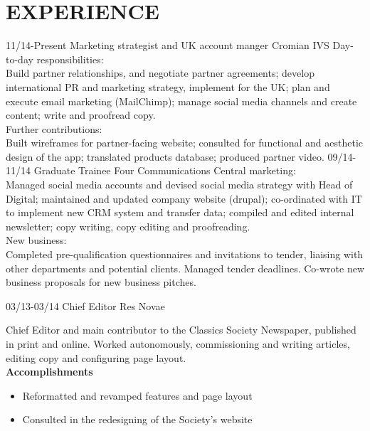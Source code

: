 \documentclass[]{friggeri-cv}
\begin{document}
\section{EXPERIENCE}

\begin{entrylist}
  \entry
  {11/14-Present}
  {Marketing strategist and UK account manger}
  {Cromian IVS}
  {Day-to-day responsibilities:\\
  	Build partner relationships, and negotiate partner agreements; develop international PR and marketing strategy, implement for the UK; plan and execute email marketing (MailChimp); manage social media channels and create content; write and proofread copy. \\
  	
  	Further contributions:\\
  	Built wireframes for partner-facing website; consulted for functional and aesthetic design of the app; translated products database; produced partner video.}
  \entry
  {09/14-11/14}
  {Graduate Trainee}
  {Four Communications}
  {Central marketing:\\
  	Managed social media accounts and devised social media strategy with Head of Digital; maintained and updated company website (drupal); co-ordinated with IT to implement new CRM system and transfer data; compiled and edited internal newsletter; copy writing, copy editing and proofreading.\\
  	
  	New business:\\
  	Completed pre-qualification questionnaires and invitations to tender, liaising with other departments and potential clients. Managed tender deadlines. Co-wrote new business proposals for new business pitches.}
  
  \entry
    {03/13-03/14}
    {Chief Editor}
    {Res Novae}
    {Chief Editor and main contributor to the Classics Society Newspaper, published in print and online. Worked autonomously, commissioning and writing articles, editing copy and configuring page layout. \\
    \textbf{Accomplishments}
    \begin{itemize}
    	\item Reformatted and revamped features and page layout
    	\item Consulted in the redesigning of the Society's website
    \end{itemize}
    }   
   \end{entrylist}
\end{document}
